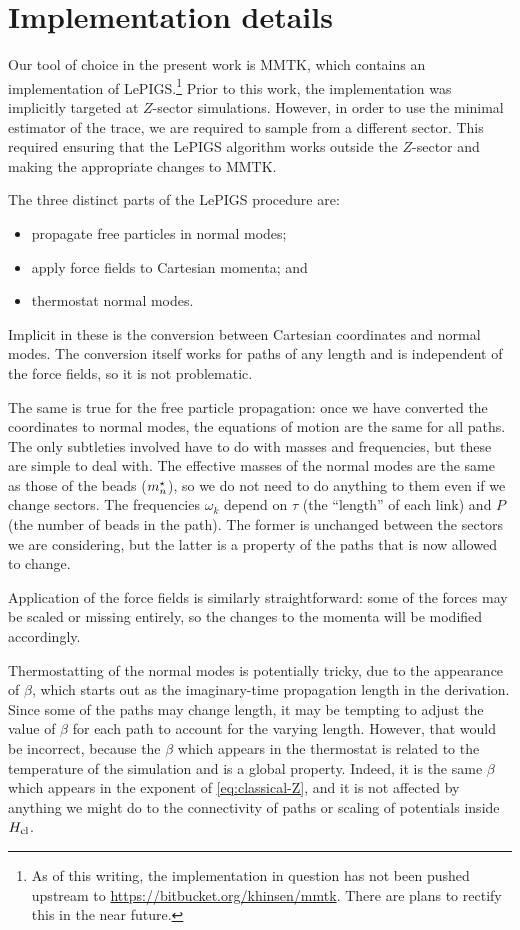 \section{Implementation details}

Our tool of choice in the present work is MMTK, which contains an implementation of LePIGS.\footnote{
	As of this writing, the implementation in question has not been pushed upstream to \url{https://bitbucket.org/khinsen/mmtk}.
	There are plans to rectify this in the near future.
}
Prior to this work, the implementation was implicitly targeted at $Z$-sector simulations.
However, in order to use the minimal estimator of the trace, we are required to sample from a different sector.
This required ensuring that the LePIGS algorithm works outside the $Z$-sector and making the appropriate changes to MMTK.

The three distinct parts of the LePIGS procedure are:
\begin{itemize}
	\item propagate free particles in normal modes;
	\item apply force fields to Cartesian momenta; and
	\item thermostat normal modes.
\end{itemize}
Implicit in these is the conversion between Cartesian coordinates and normal modes.
The conversion itself works for paths of any length and is independent of the force fields, so it is not problematic.

The same is true for the free particle propagation: once we have converted the coordinates to normal modes, the equations of motion are the same for all paths.
The only subtleties involved have to do with masses and frequencies, but these are simple to deal with.
The effective masses of the normal modes are the same as those of the beads (${m}^\star_n$), so we do not need to do anything to them even if we change sectors.
The frequencies $\omega_k$ depend on $\tau$ (the ``length'' of each link) and $P$ (the number of beads in the path).
The former is unchanged between the sectors we are considering, but the latter is a property of the paths that is now allowed to change.

Application of the force fields is similarly straightforward: some of the forces may be scaled or missing entirely, so the changes to the momenta will be modified accordingly.

Thermostatting of the normal modes is potentially tricky, due to the appearance of $\beta$, which starts out as the imaginary-time propagation length in the derivation.
Since some of the paths may change length, it may be tempting to adjust the value of $\beta$ for each path to account for the varying length.
However, that would be incorrect, because the $\beta$ which appears in the thermostat is related to the temperature of the simulation and is a global property.
Indeed, it is the same $\beta$ which appears in the exponent of \vref{eq:classical-Z}, and it is not affected by anything we might do to the connectivity of paths or scaling of potentials inside $H_\mathrm{cl}$.

